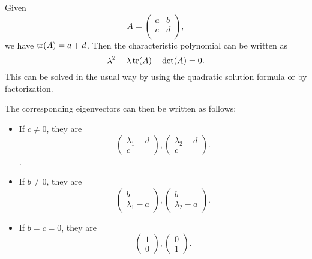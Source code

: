 \documentclass{article}
\begin{document}
Given
\begin{equation*}
  A = \begin{pmatrix}
    a & b \\
    c & d\\
  \end{pmatrix},
\end{equation*}
we have \(\operatorname{tr}(A) = a + d\).  Then the characteristic polynomial can be written as
\begin{equation*}
  \lambda^2 - \lambda \operatorname{tr}(A) + \det(A) = 0.
\end{equation*}
This can be solved in the usual way by using the quadratic solution formula or by factorization.

The corresponding eigenvectors can then be written as follows:
\begin{itemize}
\item If \(c \neq 0\), they are
  \begin{equation*}
    \begin{pmatrix}
      \lambda_1 - d \\
      c 
    \end{pmatrix},
    \begin{pmatrix}
      \lambda_2 - d \\
      c 
    \end{pmatrix}.
  \end{equation*}.
\item If \(b \neq 0\), they are
  \begin{equation*}
    \begin{pmatrix}
      b \\
      \lambda_1 - a
    \end{pmatrix},
    \begin{pmatrix}
      b \\
      \lambda_2 - a 
    \end{pmatrix}.
  \end{equation*}
\item If \(b = c = 0\), they are
  \begin{equation*}
    \begin{pmatrix}
      1 \\
      0
    \end{pmatrix},
    \begin{pmatrix}
      0 \\
      1
    \end{pmatrix}.
  \end{equation*}
\end{itemize}
\end{document}
